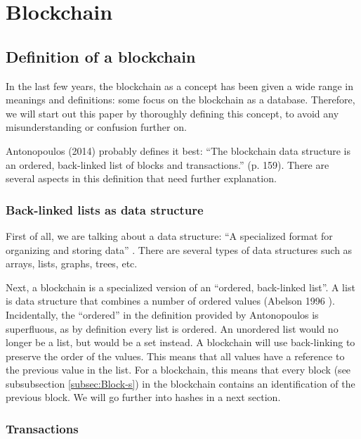 \section{Blockchain}

\subsection{Definition of a blockchain}

\iffalse
todo: 

\fi

In the last few years, the blockchain as a concept has been given a wide range in meanings and definitions: some focus on the blockchain as a database. Therefore, we will start out this paper by thoroughly defining this concept, to avoid any misunderstanding or confusion further on.

Antonopoulos (2014) \cite{antonopoulos:2014} probably defines it best: ``The blockchain data structure is an ordered, back-linked list of blocks and transactions.'' (p. 159). There are several aspects in this definition that need further explanation.

\subsubsection{Back-linked lists as data structure}

First of all, we are talking about a data structure: ``A specialized format for organizing and storing data'' \cite{data-structure}. There are several types of data structures such as arrays, lists, graphs, trees, etc.

Next, a blockchain is a specialized version of an ``ordered, back-linked list''. A list is data structure that combines a number of ordered values (Abelson 1996 \cite{abelson:1996}).  Incidentally, the ``ordered'' in the definition provided by Antonopoulos is superfluous, as by definition every list is ordered. An unordered list would no longer be a list, but would be a set instead. A blockchain will use back-linking to preserve the order of the values. This means that all values have a reference to the previous value in the list. For a blockchain, this means that every block (see subsubsection \ref{subsec:Block-s}) in the blockchain contains an identification of the previous block. We will go further into hashes in a next section.

\subsubsection{Transactions}

